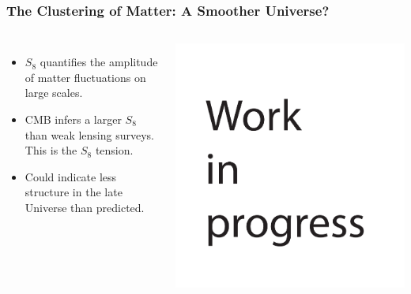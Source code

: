 \documentclass[aspectratio=169]{beamer}
\begin{document}
\begin{frame}
    \frametitle{The Clustering of Matter: A Smoother Universe?}
    \begin{columns}
        \begin{itemize}
            \item $S_8$ quantifies the amplitude of matter fluctuations on large scales.
            \item CMB infers a larger $S_8$ than weak lensing surveys. This is the $S_8$ tension.
            \item Could indicate less structure in the late Universe than predicted.
        \end{itemize}
        \includegraphics[width=\textwidth]{figures/Intro_S8_whisk.pdf}
    \end{columns}
\end{frame}
\end{document}

